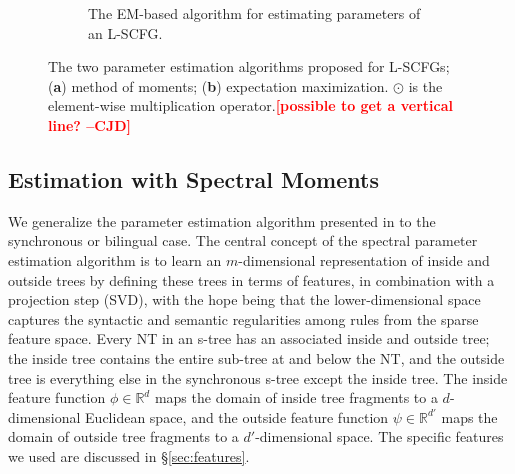 \documentclass[11pt]{article}
\newcommand{\cjd}[1]{\textcolor{red}{\textbf{[#1 --CJD] }}}
\begin{document}
\begin{figure*}[t!]
{\begin{footnotesize}
\begin{subfigure}{1.05\columnwidth}
\begin{itemize}
\begin{itemize}[label={},nolistsep]
			\end{itemize}
	\end{itemize}		
	\caption{\small The EM-based algorithm for estimating parameters of an L-SCFG.}
	\label{fig:emlearn}	
	\end{subfigure}		
	\end{footnotesize}}
	\caption{The two parameter estimation algorithms proposed for L-SCFGs; (\textbf{a}) method of moments; (\textbf{b}) expectation maximization. $\odot$ is the element-wise multiplication operator.\cjd{possible to get a vertical line?}}
	\label{fig:estimation-algos}
\end{figure*}

\subsection{Estimation with Spectral Moments}
\label{sec:spectral} 
We generalize the parameter estimation algorithm presented in  to the synchronous or bilingual case. 
The central concept of the spectral parameter estimation algorithm is to learn an $m$-dimensional representation of inside and outside trees by defining these trees in terms of features, in combination with a projection step (SVD), with the hope being that the lower-dimensional space captures the syntactic and semantic regularities among rules from the sparse feature space. 
Every NT in an s-tree has an associated inside and outside tree; the inside tree contains the entire sub-tree at and below the NT, and the outside tree is everything else in the synchronous s-tree except the inside tree.   
The inside feature function $\phi \in \mathbb{R}^d$ maps the domain of inside tree fragments to a $d$-dimensional Euclidean space, and the outside feature function $\psi \in \mathbb{R}^{d'}$ maps the domain of outside tree fragments to a $d'$-dimensional space. 
The specific features we used are discussed in \S\ref{sec:features}.  
\end{document}
